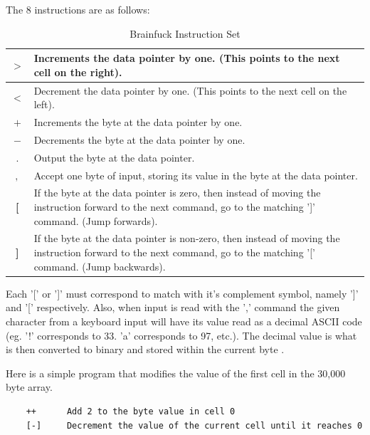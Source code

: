 The 8 instructions are as follows:
\begin{table}[h!tb]
    \centering
    \begin{tabular}{|c|p{10cm}|}
        \hline
        \textbf{$>$} & Increments the data pointer by one. (This points to the next cell on the right). \\
        \hline
        \textbf{$<$} & Decrement the data pointer by one. (This points to the next cell on the left). \\
        \hline
        \textbf{$+$} & Increments the byte at the data pointer by one. \\
        \hline
        \textbf{$-$} & Decrements the byte at the data pointer by one. \\
        \hline
        \textbf{$.$} & Output the byte at the data pointer. \\
        \hline
        \textbf{$,$} & Accept one byte of input, storing its value in the byte at the data pointer.\\
        \hline
        \textbf{[} & If the byte at the data pointer is zero, then instead of moving the instruction forward to the next command, go to the matching ']' command. (Jump forwards). \\
        \hline
        \textbf{]} & If the byte at the data pointer is non-zero, then instead of moving the instruction forward to the next command, go to the matching '[' command. (Jump backwards). \\
        \hline
    \end{tabular}
    \caption{Brainfuck Instruction Set}
    \label{tab:BrainfuckInstructionSet}
\end{table}

Each '[' or ']' must correspond to match with it's complement symbol, namely ']' and '[' respectively.
Also, when input is read with the ',' command the given character from a keyboard input will have its value read as a decimal ASCII code
(eg. '!' corresponds to 33. 'a' corresponds to 97, etc.).
The decimal value is what is then converted to binary and stored within the current byte \cite{BfSO}.

Here is a simple program that modifies the value of the first cell in the 30,000 byte array.

\begin{verbatim}
    ++      Add 2 to the byte value in cell 0
    [-]     Decrement the value of the current cell until it reaches 0
\end{verbatim}

